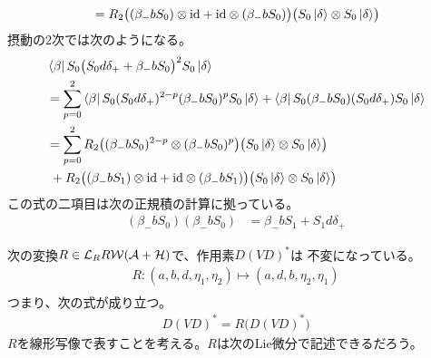 {\begin{equation*}
\begin{split}
		&= R_2 \bigl((\beta_-bS_0)\otimes{\ensuremath{\operatorname{id}}} + {\operatorname{id}}\otimes(\beta_-bS_0)\bigr)
			\bigl(S_0\mathinner{|{\delta}\rangle}\otimes S_0\mathinner{|{\delta}\rangle}\bigr) \\
	\end{split}\end{equation*}
	摂動の$2$次では次のようになる。
	\begin{equation*}\begin{split}
		&\mathinner{\langle{\beta}|}S_0\bigl(S_0d\delta_+ + \beta_-bS_0\bigr)^2
			S_0\mathinner{|{\delta}\rangle} \\
		&= \sum_{p=0}^2\mathinner{\langle{\beta}|}S_0 (S_0d\delta_+)^{2-p} (\beta_-bS_0)^p
			S_0\mathinner{|{\delta}\rangle}
			+ \mathinner{\langle{\beta}|}S_0 (\beta_-bS_0)(S_0d\delta_+) S_0\mathinner{|{\delta}\rangle} \\
		&= \sum_{p=0}^2 R_2 
			\bigl((\beta_-bS_0)^{2-p}\otimes(\beta_-bS_0)^p\bigr)
			\bigl(S_0\mathinner{|{\delta}\rangle}\otimes S_0\mathinner{|{\delta}\rangle}\bigr) \\
		&\;+ R_2 \bigl((\beta_-bS_1)\otimes{\ensuremath{\operatorname{id}}} + {\operatorname{id}}\otimes(\beta_-bS_1)\bigr)
			\bigl(S_0\mathinner{|{\delta}\rangle}\otimes S_0\mathinner{|{\delta}\rangle}\bigr) \\
	\end{split}\end{equation*}
	この式の二項目は次の正規積の計算に拠っている。
	\begin{equation*}\begin{split}
		(\beta_-bS_0)(\beta_-bS_0) &= \beta_-bS_1 + S_1d\delta_+
	\end{split}\end{equation*}

	\begin{todo}[ここまで]\label{todo:ここまで} %
	\end{todo} %
	次の変換$R\in\mathcal{L}_RR{{\mathcal{W}}}({{\mathcal{A}}}+{{\mathcal{H}}})$で、作用素$D(VD)^*$は
	不変になっている。
	\begin{equation}\label{eq:真空期待値を不変にする文字の置換}\begin{split}
		R: (a,b,d,\eta_1,\eta_2) \mapsto (a,d,b,\eta_2,\eta_1) \\
	\end{split}\end{equation}
	つまり、次の式が成り立つ。
	\begin{equation*}\begin{split}
		D(VD)^* = R\bigl(D(VD)^*\bigr)
	\end{split}\end{equation*}
	$R$を線形写像で表すことを考える。$R$は次のLie微分で記述できるだろう。
	\begin{equation*}\begin{split}
	\end{split}\end{equation*}

}
